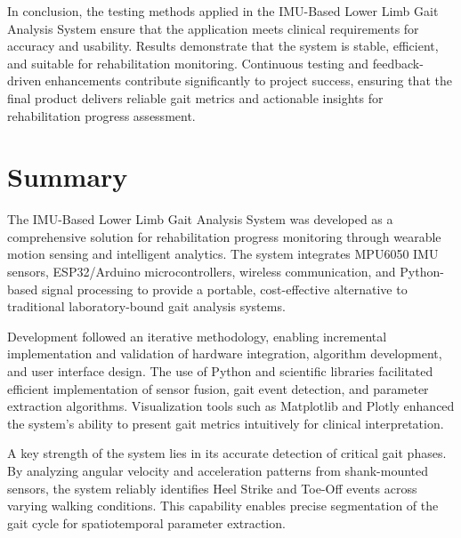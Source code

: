 \documentclass[12pt,a4paper]{report}
\begin{document}
In conclusion, the testing methods applied in the IMU-Based Lower Limb Gait Analysis System ensure that the application meets clinical requirements for accuracy and usability. Results demonstrate that the system is stable, efficient, and suitable for rehabilitation monitoring. Continuous testing and feedback-driven enhancements contribute significantly to project success, ensuring that the final product delivers reliable gait metrics and actionable insights for rehabilitation progress assessment.


\setcounter{chapter}{7}
\clearpage
\thispagestyle{empty}

\noindent
{}

\clearpage
{}
\setcounter{section}{0}


\section{Summary}

The IMU-Based Lower Limb Gait Analysis System was developed as a comprehensive solution for rehabilitation progress monitoring through wearable motion sensing and intelligent analytics. The system integrates MPU6050 IMU sensors, ESP32/Arduino microcontrollers, wireless communication, and Python-based signal processing to provide a portable, cost-effective alternative to traditional laboratory-bound gait analysis systems.

Development followed an iterative methodology, enabling incremental implementation and validation of hardware integration, algorithm development, and user interface design. The use of Python and scientific libraries facilitated efficient implementation of sensor fusion, gait event detection, and parameter extraction algorithms. Visualization tools such as Matplotlib and Plotly enhanced the system's ability to present gait metrics intuitively for clinical interpretation.

A key strength of the system lies in its accurate detection of critical gait phases. By analyzing angular velocity and acceleration patterns from shank-mounted sensors, the system reliably identifies Heel Strike and Toe-Off events across varying walking conditions. This capability enables precise segmentation of the gait cycle for spatiotemporal parameter extraction.
\end{document}
